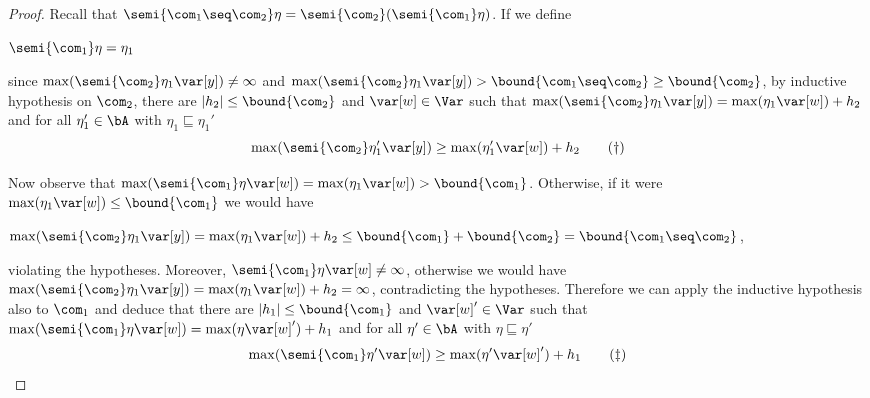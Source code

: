 \begin{proof}
  Recall that
  \(\semi{\com_1 \seq \com_2} \eta = \semi{\com_2}(\semi{\com_1}\eta)\).
  If we define
  \begin{center}
    \(\semi{\com_1} \eta = \eta_1\)
  \end{center}
  since \(\max(\semi{\com_2}\eta_1 \var[y]) \neq \infty\) and
  \(\max(\semi{\com_2} \eta_1 \var[y]) > \bound{\com_1 \seq \com_2}
  \geq \bound{\com_2}\), by inductive hypothesis on \(\com_2\), there
  are \(|h_2| \leq \bound{\com_2}\) and \(\var[w] \in \Var\) such that
  \(\max(\semi{\com_2} \eta_1 \var[y]) = \max(\eta_1 \var[w]) + h_2\)
  and for all \(\eta_1' \in \bA\) with
  \(\eta_1 \sqsubseteq \eta_1'\)
  \begin{equation}
    \label{eq:seq2}
    \max(\semi{\com_2} \eta_1' \var[y]) \geq \max(\eta_1' \var[w]) + h_2
    \tag{\dag}
  \end{equation}
  
  Now observe that
  \(\max(\semi{\com_1}\eta \var[w]) = \max(\eta_1 \var[w]) >
  \bound{\com_1}\). Otherwise, if it were \(\max(\eta_1 \var[w]) \leq
  \bound{\com_1}\) we would have
  \begin{center}
    \(\max(\semi{\com_2}\eta_1 \var[y]) = \max(\eta_1 \var[w]) + h_2 \leq
    \bound{\com_1} + \bound{\com_2} = \bound{\com_1 \seq \com_2}\),
  \end{center}
  violating the hypotheses. Moreover,
  \(\semi{\com_1}\eta \var[w] \neq \infty\), otherwise we would have
  \(\max(\semi{\com_2} \eta_1 \var[y]) = \max(\eta_1 \var[w]) + h_2 =
  \infty\), contradicting the hypotheses.  Therefore we can apply the
  inductive hypothesis also to \(\com_1\) and deduce that there are
  \(|h_1| \leq \bound{\com_1}\) and \(\var[w]' \in \Var\) such that
  \(\max(\semi{\com_1} \eta \var[w]) = \max(\eta \var[w]') + h_1\) and
  for all \(\eta' \in \bA\) with \(\eta \sqsubseteq \eta'\)
  \begin{equation}
    \label{eq:seq1}
    \max(\semi{\com_1} \eta' \var[w]) \geq \max(\eta' \var[w]') + h_1
    \tag{\ddag}
  \end{equation}


\end{proof}
